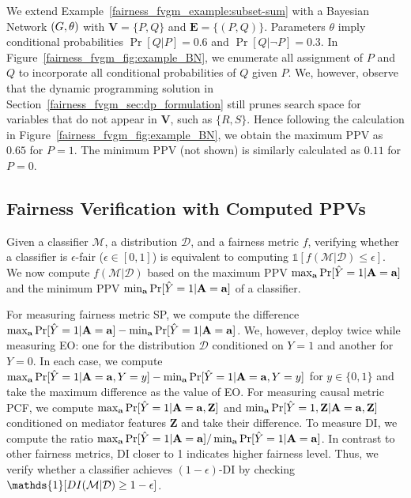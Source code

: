  	 
	\begin{example}
		We extend Example~\ref{fairness_fvgm_example:subset-sum} with a Bayesian Network $ (G, \theta) $ with $ \mathbf{V} = \{P, Q\} $ and $ \mathbf{E} = \{(P,Q)\} $. Parameters $ \theta $ imply conditional probabilities $ \Pr[Q|P] = 0.6 $ and $ \Pr[Q|\neg P] = 0.3 $. 	In Figure~\ref{fairness_fvgm_fig:example_BN}, we enumerate all  assignment of $ P $ and $ Q $ to  incorporate all conditional probabilities of $ Q $ given $ P $. We, however, observe that the dynamic programming solution in Section~\ref{fairness_fvgm_sec:dp_formulation} still prunes search space for variables that do not appear in $ \mathbf{V} $, such as $ \{R, S\} $. Hence following the calculation in Figure~\ref{fairness_fvgm_fig:example_BN}, we obtain the maximum PPV  as $ 0.65 $ for $ P = 1 $. The minimum PPV (not shown)  is similarly calculated as $ 0.11 $ for $ P = 0 $. 
	\end{example}


	\subsection{Fairness Verification with Computed PPVs} 
	Given a classifier $\mathcal{M}$, a  distribution $\mathcal{D}$, and a fairness metric $f$, verifying whether a classifier is $\epsilon$-fair ($\epsilon \in [0,1]$) is equivalent to computing $\mathds{1}[f(\mathcal{M}|\mathcal{D})\leq \epsilon]$. We now compute $f(\mathcal{M}|\mathcal{D})$ based on the maximum PPV $ \max_{ \mathbf{a}} \Pr[\hat{Y} =1 | \mathbf{A} = \mathbf{a}] $ and the  minimum PPV $ \min_{ \mathbf{a}} \Pr[\hat{Y} =1 | \mathbf{A} = \mathbf{a}] $ of a classifier.
	
	For measuring fairness metric SP, we compute the difference $ \max_{ \mathbf{a}} \Pr[\hat{Y} =1 | \mathbf{A} = \mathbf{a}]  - \min_{ \mathbf{a}} \Pr[\hat{Y} =1 | \mathbf{A} = \mathbf{a}] $. We, however, deploy {\fvgm} twice while measuring EO: one for the distribution $ \mathcal{D} $ conditioned on $ Y = 1  $ and another for $ Y = 0 $. 
	In each case, we compute $ \max_{ \mathbf{a}} \Pr[\hat{Y} =1 | \mathbf{A} = \mathbf{a}, Y = y ]  - \min_{ \mathbf{a}} \Pr[\hat{Y} =1 | \mathbf{A} = \mathbf{a}, Y = y ] $ for $ y \in \{0,1\} $ and take the  maximum difference as the value of EO.  
	For measuring causal metric PCF, we compute  $ \max_{ \mathbf{a}} \Pr[\hat{Y} =1 | \mathbf{A} = \mathbf{a}, \mathbf{Z}] $ and  $ \min_{ \mathbf{a}} \Pr[\hat{Y} =1, \mathbf{Z}| \mathbf{A} = \mathbf{a} , \mathbf{Z}] $ conditioned on mediator features $ \mathbf{Z} $ and take their difference. 
	To measure DI, we compute the ratio $ \max_{ \mathbf{a}} \Pr[\hat{Y} =1 | \mathbf{A} = \mathbf{a}] / \min_{ \mathbf{a}} \Pr[\hat{Y} =1 | \mathbf{A} = \mathbf{a}] $. In contrast to other fairness metrics, DI closer to 1 indicates higher fairness level. Thus, we verify whether a classifier achieves $(1 - \epsilon)$-DI by checking $ \mathds{1}[DI(\alg| \mathcal{D}) \ge 1 - \epsilon] $. 
	
